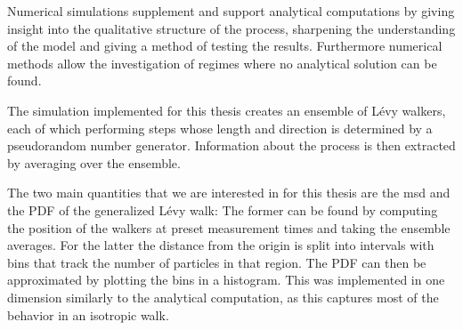 Numerical simulations supplement and support analytical computations by giving insight into the qualitative structure of the process, sharpening the understanding of the model and giving a method of testing the results. Furthermore numerical methods allow the investigation of regimes where no analytical solution can be found.

The simulation implemented for this thesis creates an ensemble of L\'evy walkers, each of which performing steps whose length and direction is determined by a pseudorandom number generator. Information about the process is then extracted by averaging over the ensemble. 

The two main quantities that we are interested in for this thesis are the \gls*{msd} and the \gls*{PDF} of the generalized L\'evy walk: The former can be found by computing the position of the walkers at preset measurement times and taking the ensemble averages. For the latter the distance from the origin is split into intervals with bins that track the number of particles in that region. The \gls*{PDF} can then be approximated by plotting the bins in a histogram. This was implemented in one dimension similarly to the analytical computation, as this captures most of the behavior in an isotropic walk. 

